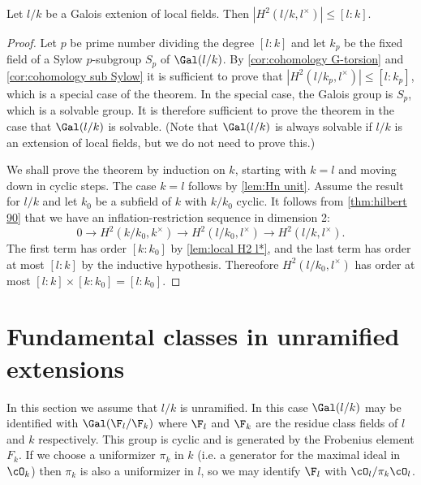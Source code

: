 \begin{theorem} \label{lem:local H2 upper bound}
	Let $l/k$ be a Galois extenion of local fields.
	Then $|H^2(l/k,l^\times)| \le [l:k]$.
\end{theorem}

\begin{proof}
	Let $p$ be prime number dividing the degree $[l:k]$ and let $k_p$ be the fixed field
	of a Sylow $p$-subgroup $S_p$ of $\Gal(l/k)$.
	By \ref{cor:cohomology G-torsion} and \ref{cor:cohomology sub Sylow}
	it is sufficient to prove that $|H^2(l/k_p,l^\times)| \le [l:k_p]$,
	which is a special case of the theorem.
	In the special case, the Galois group is $S_p$, which is a solvable group.
	It is therefore sufficient to prove the theorem in the case that $\Gal(l/k)$ is solvable.
	(Note that $\Gal(l/k)$ is always solvable if $l/k$ is an extension of local fields,
	but we do not need to prove this.)

	We shall prove the theorem by induction on $k$, starting with $k=l$ and moving down in
	cyclic steps.
	The case $k=l$ follows by \ref{lem:Hn unit}.
	Assume the result for $l/k$ and let $k_0$ be a subfield of $k$ with $k/k_0$ cyclic.
	It follows from \ref{thm:hilbert 90} that
	we have an inflation-restriction sequence in dimension 2:
	\[
		0 \to H^2(k/k_0, k^\times) \to H^2( l/k_0, l^\times) \to H^2(l/k, l^\times).
	\]
	The first term has order $[k : k_0]$ by \ref{lem:local H2 l*}, and the last term has
	order at most $[l:k]$ by the inductive hypothesis.
	Thereofore $H^2( l/k_0, l^\times)$ has order at most $[l:k] \times [k : k_0] = [l: k_0]$.
\end{proof}







\section{Fundamental classes in unramified extensions}

In this section we assume that $l/k$ is unramified.
In this case $\Gal(l/k)$ may be identified with $\Gal(\F_l / \F_k)$ where
$\F_l$ and $\F_k$ are the residue class fields of $l$ and $k$ respectively.
This group is cyclic and is generated by the Frobenius element $F_k$.
If we choose a uniformizer $\pi_k$ in $k$ (i.e. a generator for the maximal ideal in $\cO_k$)
then $\pi_k$ is also a uniformizer in $l$, so we may identify $\F_l$ with $\cO_l / \pi_k \cO_l$.

